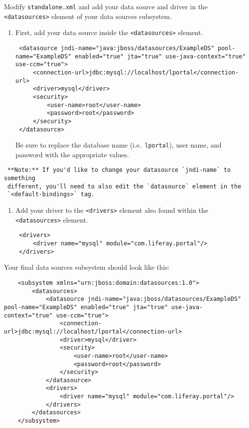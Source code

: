 Modify \texttt{standalone.xml} and add your data source and driver in
the \texttt{\textless{}datasources\textgreater{}} element of your data
sources subsystem.

\begin{enumerate}
\def\labelenumi{\arabic{enumi}.}
\item
  First, add your data source inside the
  \texttt{\textless{}datasources\textgreater{}} element.

\begin{verbatim}
 <datasource jndi-name="java:jboss/datasources/ExampleDS" pool-name="ExampleDS" enabled="true" jta="true" use-java-context="true" use-ccm="true">
     <connection-url>jdbc:mysql://localhost/lportal</connection-url>
     <driver>mysql</driver>
     <security>
         <user-name>root</user-name>
         <password>root</password>
     </security>
 </datasource>
\end{verbatim}

  Be sure to replace the database name (i.e.~\texttt{lportal}), user
  name, and password with the appropriate values.
\end{enumerate}

\noindent\hrulefill

\begin{verbatim}
 **Note:** If you'd like to change your datasource `jndi-name` to something
 different, you'll need to also edit the `datasource` element in the
 `<default-bindings>` tag.
\end{verbatim}

\noindent\hrulefill

\begin{enumerate}
\def\labelenumi{\arabic{enumi}.}
\setcounter{enumi}{1}
\item
  Add your driver to the \texttt{\textless{}drivers\textgreater{}}
  element also found within the
  \texttt{\textless{}datasources\textgreater{}} element.

\begin{verbatim}
 <drivers>
     <driver name="mysql" module="com.liferay.portal"/>
 </drivers>
\end{verbatim}
\end{enumerate}

Your final data sources subsystem should look like this:

\begin{verbatim}
    <subsystem xmlns="urn:jboss:domain:datasources:1.0">
        <datasources>
            <datasource jndi-name="java:jboss/datasources/ExampleDS" pool-name="ExampleDS" enabled="true" jta="true" use-java-context="true" use-ccm="true">
                <connection-url>jdbc:mysql://localhost/lportal</connection-url>
                <driver>mysql</driver>
                <security>
                    <user-name>root</user-name>
                    <password>root</password>
                </security>
            </datasource>
            <drivers>
                <driver name="mysql" module="com.liferay.portal"/>
            </drivers>
        </datasources>
    </subsystem>
\end{verbatim}


